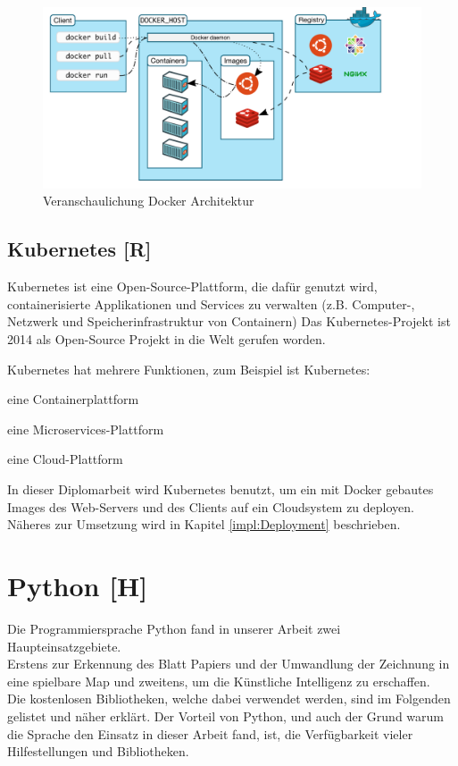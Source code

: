\begin{figure}[H]
    \centering
    \includegraphics[scale=0.6]{pics/docker architecture.PNG}
    \caption{Veranschaulichung Docker Architektur \cite{docker_architektur}}
\end{figure}


\subsection{Kubernetes [R]}
Kubernetes ist eine Open-Source-Plattform, die dafür genutzt wird, containerisierte Applikationen und Services zu verwalten (z.B. Computer-, Netzwerk und Speicherinfrastruktur von Containern)
Das Kubernetes-Projekt ist 2014 als Open-Source Projekt in die Welt gerufen worden.

Kubernetes hat mehrere Funktionen, zum Beispiel ist Kubernetes:
\begin{compactitem}
    \item eine Containerplattform
    \item eine Microservices-Plattform
    \item eine Cloud-Plattform
\end{compactitem}
\cite{kubernetes}

In dieser Diplomarbeit wird Kubernetes benutzt, um ein mit Docker gebautes Images des Web-Servers und des Clients auf ein Cloudsystem zu deployen. Näheres zur Umsetzung wird in Kapitel \ref{impl:Deployment} beschrieben.

\newpage
\section{Python [H]}
Die Programmiersprache Python
fand in unserer Arbeit zwei Haupteinsatzgebiete. \\
Erstens zur Erkennung des Blatt Papiers und der Umwandlung der Zeichnung in eine spielbare Map
und zweitens, um die Künstliche Intelligenz zu erschaffen. \\
Die kostenlosen Bibliotheken, welche dabei verwendet werden, sind im Folgenden gelistet und näher
erklärt.
Der Vorteil von Python, und auch der Grund warum die Sprache den Einsatz in dieser Arbeit fand,
ist, die Verfügbarkeit vieler Hilfestellungen und Bibliotheken.

